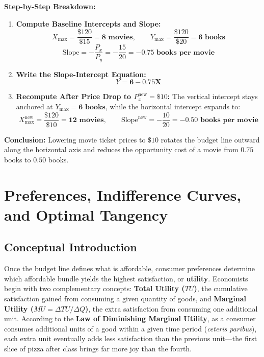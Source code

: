\documentclass[11pt,letterpaper]{article}
\begin{document}
\noindent\textbf{Step-by-Step Breakdown:}
\begin{enumerate}
    \item \textbf{Compute Baseline Intercepts and Slope:}
    \[
    X_{\max} = \frac{\$120}{\$15} = \mathbf{8\text{ movies}}, \qquad Y_{\max} = \frac{\$120}{\$20} = \mathbf{6\text{ books}}
    \]
    \[
    \text{Slope} = -\frac{P_x}{P_y} = -\frac{15}{20} = \mathbf{-0.75\text{ books per movie}}
    \]

    \item \textbf{Write the Slope-Intercept Equation:}
    \[
    Y = \mathbf{6 - 0.75X}
    \]

    \item \textbf{Recompute After Price Drop to $P_x^{\text{new}} = \$10$:}
    The vertical intercept stays anchored at $Y_{\max} = \mathbf{6\text{ books}}$, while the horizontal intercept expands to:
    \[
    X_{\max}^{\text{new}} = \frac{\$120}{\$10} = \mathbf{12\text{ movies}}, \qquad \text{Slope}^{\text{new}} = -\frac{10}{20} = \mathbf{-0.50\text{ books per movie}}
    \]
\end{enumerate}
\textbf{Conclusion:} Lowering movie ticket prices to $\$10$ rotates the budget line outward along the horizontal axis and reduces the opportunity cost of a movie from $0.75$ books to $0.50$ books.

\section{Preferences, Indifference Curves, and Optimal Tangency}

\subsection*{Conceptual Introduction}
Once the budget line defines what is affordable, consumer preferences determine which affordable bundle yields the highest satisfaction, or \textbf{utility}. Economists begin with two complementary concepts: \textbf{Total Utility ($TU$)}, the cumulative satisfaction gained from consuming a given quantity of goods, and \textbf{Marginal Utility ($MU = \Delta TU / \Delta Q$)}, the extra satisfaction from consuming one additional unit. According to the \textbf{Law of Diminishing Marginal Utility}, as a consumer consumes additional units of a good within a given time period (\emph{ceteris paribus}), each extra unit eventually adds less satisfaction than the previous unit—the first slice of pizza after class brings far more joy than the fourth.
\end{document}
